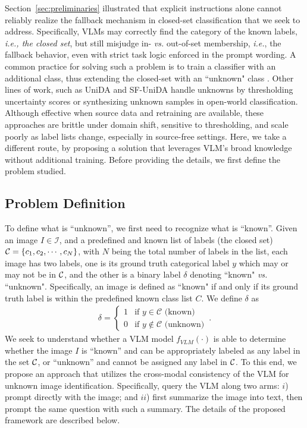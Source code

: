 \documentclass[10pt]{article} %
\begin{document}
Section~\ref{sec:preliminaries} illustrated that explicit instructions alone cannot reliably realize the fallback mechanism in closed-set classification that we seek to address.
Specifically, VLMs may correctly find the category of the known labels, {\em i.e., the closed set}, but still misjudge in- {\em vs.} out-of-set membership, {\em i.e.}, the fallback behavior, even with strict task logic enforced in the prompt wording.
A common practice for solving such a problem is to train a classifier with an additional class, thus extending the closed-set with an ``unknown" class \citep{zhan2021out, Shu2021}.
Other lines of work, such as UniDA \citep{liang2021umad} and SF-UniDA handle unknowns by thresholding uncertainty scores or synthesizing unknown samples \citep{bai2022open} in open-world classification.
Although effective when source data and retraining are available, these approaches are brittle under domain shift, sensitive to thresholding, and scale poorly as label lists change, especially in source-free settings.
Here, we take a different route, by proposing a solution that leverages VLM's broad knowledge without additional training.
Before providing the details, we first define the problem studied.

\subsection{Problem Definition}
To define what is ``unknown'', we first need to recognize what is ``known''.
Given an image $I \in \mathcal{I}$, and a predefined and known list of labels (the closed set) ${\cal C}=\{c_1, c_2, \cdots, c_N\}$, with $N$ being the total number of labels in the list, each image has two labels, one is its ground truth categorical label $y$ which may or may not be in ${\cal C}$, and the other is a binary label $\delta$ denoting ``known" {\em vs.} ``unknown".
Specifically, an image is defined as ``known" if and only if its ground truth label is within the predefined known class list $C$.
We define $\delta$ as
%
\begin{align*}
\delta = \begin{cases}
1 & \text{if } y \in \mathcal{C} \text{ (known)} \\
0 & \text{if } y \notin \mathcal{C} \text{ (unknown)}
\end{cases} \,.
\end{align*}
%
We seek to understand whether a VLM model $f_{VLM}(\cdot)$ is able to determine whether the image $I$ is ``known'' and can be appropriately labeled as any label in the set ${\cal C}$, or ``unknown'' and cannot be assigned any label in ${\cal C}$.
To this end, we propose an approach that utilizes the cross-modal consistency of the VLM for unknown image identification.
Specifically, query the VLM along two arms:
$i$) prompt directly with the image; and
$ii$) first summarize the image into text, then prompt the same question with such a summary.
The details of the proposed framework are described below.
\end{document}
